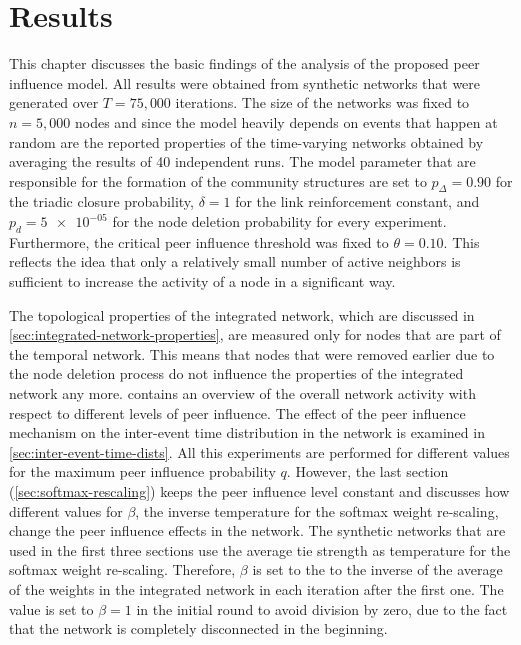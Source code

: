\chapter{Results}
\label{cha:results}


This chapter discusses the basic findings of the analysis of the proposed peer influence model.
All results were obtained from synthetic networks that were generated over \( T = 75,000 \) iterations.
The size of the networks was fixed to \(n = 5,000 \) nodes and since the model heavily depends on events that happen at random are the reported properties of the time-varying networks obtained by averaging the results of 40 independent runs.
The model parameter that are responsible for the formation of the community structures are set to \( p_{\Delta} = 0.90 \) for the triadic closure probability, \( \delta = 1 \) for the link reinforcement constant, and \( p_{d} = \num{5e-05} \) for the node deletion probability for every experiment.
Furthermore, the critical peer influence threshold was fixed to \( \theta = 0.10 \).
This reflects the idea that only a relatively small number of active neighbors is sufficient to increase the activity of a node in a significant way.

The topological properties of the integrated network, which are discussed in \cref{sec:integrated-network-properties}, are measured only for nodes that are part of the temporal network.
This means that nodes that were removed earlier due to the node deletion process do not influence the properties of the integrated network any more.
 contains an overview of the overall network activity with respect to different levels of peer influence.
The effect of the peer influence mechanism on the inter-event time distribution in the network is examined in \cref{sec:inter-event-time-dists}.
All this experiments are performed for different values for the maximum peer influence probability \( q \).
However, the last section (\cref{sec:softmax-rescaling}) keeps the peer influence level constant and discusses how different values for \( \beta \), the inverse temperature for the softmax weight re-scaling, change the peer influence effects in the network.
The synthetic networks that are used in the first three sections use the average tie strength as temperature for the softmax weight re-scaling.
Therefore, \( \beta \) is set to the to the inverse of the average of the weights in the integrated network in each iteration after the first one.
The value is set to \( \beta = 1 \) in the initial round to avoid division by zero, due to the fact that the network is completely disconnected in the beginning.


